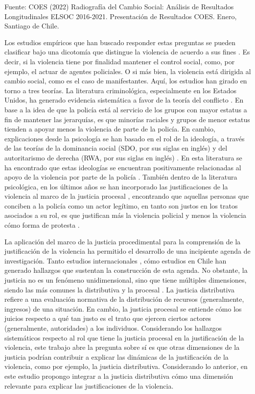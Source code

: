 \documentclass[12pt,twoside]{templates/facsothesis}
\begin{document}
Fuente: COES (2022) Radiografía del Cambio Social: Análisis de Resultados Longitudinales ELSOC 2016-2021. Presentación de Resultados COES. Enero, Santiago de Chile.

Los estudios empíricos que han buscado responder estas preguntas se pueden clasificar bajo una dicotomía que distingue la violencia de acuerdo a sus fines \citep{Blumenthal1972}. Es decir, si la violencia tiene por finalidad mantener el control social, como, por ejemplo, el actuar de agentes policiales. O si más bien, la violencia está dirigida al cambio social, como es el caso de manifestantes. Aquí, los estudios han girado en torno a tres teorías. La literatura criminológica, especialmente en los Estados Unidos, ha generado evidencia sistemática a favor de la teoría del conflicto \citep{Thompson2004}. En base a la idea de que la policía está al servicio de los grupos con mayor estatus a fin de mantener las jerarquías, es que minorías raciales y grupos de menor estatus tienden a apoyar menos la violencia de parte de la policía. En cambio, explicaciones desde la psicología se han basado en el rol de la ideología, a través de las teorías de la dominancia social (SDO, por sus siglas en inglés) \citep{Sidanius1999} y del autoritarismo de derecha (RWA, por sus siglas en inglés) \citep{Altemeyer1988}. En esta literatura se ha encontrado que estas ideologías se encuentran positivamente relacionadas al apoyo de la violencia por parte de la policía \citep{Gerber2017b}. También dentro de la literatura psicológica, en los últimos años se han incorporado las justificaciones de la violencia al marco de la justicia procesal \citep{Tyler2006}, encontrando que aquellas personas que conciben a la policía como un actor legítimo, en tanto son justos en los tratos asociados a su rol, es que justifican más la violencia policial y menos la violencia cómo forma de protesta \citep{Gerber2017a}.

La aplicación del marco de la justicia procedimental \citep{Tyler2006} para la comprensión de la justificación de la violencia ha permitido el desarrollo de una incipiente agenda de investigación. Tanto estudios internacionales \citep{Gerber2017b, Bradford2017}, cómo estudios en Chile \citep[e.g.][]{Puga2016, Gerber2016, Gerber2017a, Gerber2017} han generado hallazgos que sustentan la construcción de esta agenda. No obstante, la justicia no es un fenómeno unidimensional, sino que tiene múltiples dimensiones, siendo las más comunes la distributiva y la procesal \citep{Tornblom2007}. La justicia distributiva refiere a una evaluación normativa de la distribución de recursos (generalmente, ingresos) de una situación. En cambio, la justicia procesal se entiende cómo los juicios respecto a qué tan justo es el trato que ejercen ciertos actores (generalmente, autoridades) a los individuos. Considerando los hallazgos sistemáticos respecto al rol que tiene la justicia procesal en la justificación de la violencia, este trabajo abre la pregunta sobre sí es que otras dimensiones de la justicia podrían contribuir a explicar las dinámicas de la justificación de la violencia, como por ejemplo, la justicia distributiva. Considerando lo anterior, en este estudio propongo integrar a la justicia distributiva cómo una dimensión relevante para explicar las justificaciones de la violencia.
\end{document}
